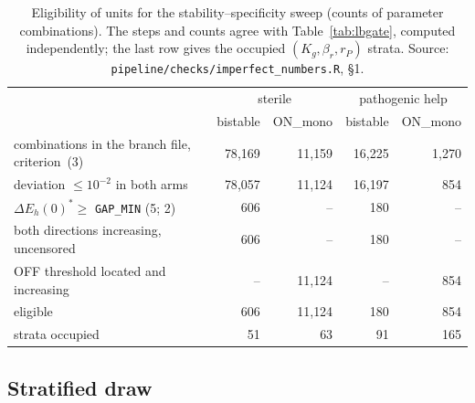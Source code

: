 \documentclass[11pt]{article}
\newcommand{\bros}{\beta_r}
\newcommand{\gap}{\Delta E_h(0)^{*}}
\begin{document}
\begin{table}[H]
\centering
\caption{Eligibility of units for the stability--specificity sweep (counts of parameter
combinations). The steps and counts agree with Table~\ref{tab:lbgate}, computed
independently; the last row gives the occupied $(K_g, \bros, r_P)$ strata. Source:
\texttt{pipeline/checks/imperfect\_numbers.R}, \S1.}
\label{tab:imp-elig}
\begin{tabular}{lrrrr}
\toprule
 & \multicolumn{2}{c}{sterile} & \multicolumn{2}{c}{pathogenic help}\\
 & bistable & ON\_mono & bistable & ON\_mono\\
\midrule
combinations in the branch file, criterion~(3) & 78{,}169 & 11{,}159 & 16{,}225 & 1{,}270\\
deviation $\le 10^{-2}$ in both arms  & 78{,}057 & 11{,}124 & 16{,}197 &   854\\
$\gap \ge$ \texttt{GAP\_MIN} (5; 2)       &    606 &   --   &    180 &   --  \\
both directions increasing, uncensored &   606 &   --   &    180 &   --  \\
OFF threshold located and increasing   &   --   & 11{,}124 &   --   &   854\\
\midrule
eligible                                &    606 & 11{,}124 &    180 &   854\\
strata occupied                         &     51 &     63 &     91 &   165\\
\bottomrule
\end{tabular}
\end{table}

\subsection{Stratified draw}
\end{document}
